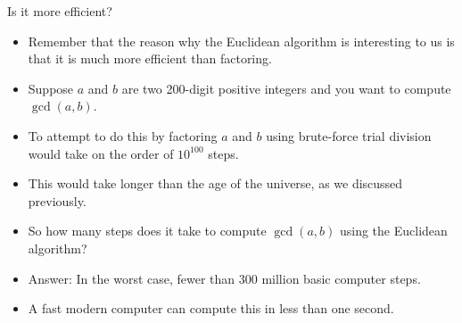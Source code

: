\documentclass[handout]{beamer}
\begin{document}
\begin{frame}{Is it more efficient?}
\begin{itemize}
\item Remember that the reason why the Euclidean algorithm is interesting to us is that it is much more
efficient than factoring.
\item Suppose $a$ and $b$ are two 200-digit positive integers and you want to compute $\gcd(a,b)$.
\item To attempt to do this by factoring $a$ and $b$ using brute-force trial division would
take on the order of $10^{100}$ steps.
\item This would take longer than the age of the universe, as we discussed previously.
\item So how many steps does it take to compute $\gcd(a,b)$ using the Euclidean algorithm?
\item Answer: In the worst case, fewer than 300 million basic computer steps.
\item A fast modern computer can compute this in less than one second.

\end{itemize}
\end{frame}
\end{document}
